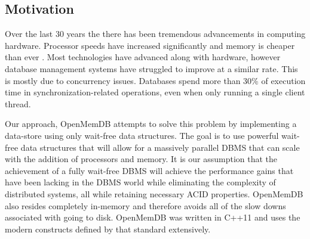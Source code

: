\documentclass[letter,11pt]{article}
\begin{document}
\subsection{Motivation}
Over the last 30 years the there has been tremendous advancements in computing
hardware. Processor speeds have increased significantly and memory is cheaper than ever
\cite{stonebraker2007end}. Most technologies have advanced 
along with hardware, however database management systems have struggled to improve
at a similar rate. This is mostly due to concurrency issues. Databases spend more than 30\% 
of execution time in synchronization-related operations, even when only running a single
client thread\cite{soares2015database}.
\par\vspace{\baselineskip}
Our approach, OpenMemDB attempts to solve this problem by implementing a data-store 
using only wait-free data structures. The goal is to use powerful wait-free data 
structures that will allow for a massively parallel DBMS that can scale with the 
addition of processors and memory. It is our assumption that the achievement of a 
fully wait-free DBMS will achieve the performance gains 
that have been lacking in the DBMS world while eliminating the complexity of 
distributed systems, all while retaining necessary ACID properties. OpenMemDB also
resides completely in-memory and therefore avoids all of the slow downs associated with
going to disk. OpenMemDB was written in C++11 and uses the modern constructs defined
by that standard extensively.
\par\vspace{\baselineskip}
\end{document}
